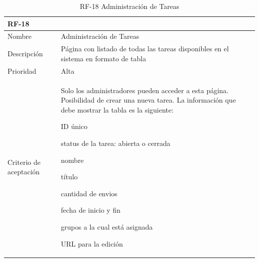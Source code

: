 \documentclass[11pt,spanish,listoffigures,listoftables]{tfgetsinf}
\begin{document}
\begin{table}[ht!]
	\centering
	\begin{tabular}{ |p{4cm}||p{10cm}|  }
		\multicolumn{2}{l}{\textbf{RF-18}} \\
		\hline
		Nombre & Administración de Tareas \\
		\hline
		Descripción & Página con listado de todas las \gls{tarea}s disponibles en el sistema en formato de tabla  \\
		\hline
		Prioridad & Alta\\
		\hline
		Criterio de aceptación & Solo los \gls{administrador}es pueden acceder a esta página. \newline
		Posibilidad de crear una nueva \gls{tarea}. \newline
		La información que debe mostrar la tabla es la siguiente: \newline
		\begin{tabitem}
			\item ID único
			\item status de la \gls{tarea}: abierta o cerrada
			\item nombre
			\item título
			\item cantidad de \gls{envio}s
			\item fecha de inicio y fin
			\item \gls{grupo}s a la cual está asignada
			\item URL para la edición
		\end{tabitem} \\
		\hline
	\end{tabular}
	\caption{RF-18 Administración de Tareas}
	\label{table:18}
\end{table}
\end{document}
